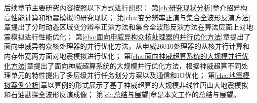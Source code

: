 后续章节主要研究内容按照以下方式进行组织：
第\ref{ch:研究现状分析}章介绍异构高性能计算和地震模拟的研究现状；
第\ref{cha:变分辨率正演与集合全波形反演方法}章提出了分时动态区域变分辨率正演方法和集合全波形反演方法在算法层面上对地震模拟进行性能优化；
第\ref{cha:面向申威异构众核处理器的并行优化方法}章提出了面向申威异构众核处理器的并行优化方法，从申威26010处理器的从核并行计算和内存带宽两方面对地震模拟进行优化；
第\ref{cha:面向神威超算系统的大规模并行优化方法}章提出了面向神威超算系统的大规模并行优化方法，根据神威超算不同处理单元的特性提出了多层级并行任务划分方案以及通信和IO优化；
第\ref{cha:地震模拟案例分析}章以算例的形式展示了基于神威超算的大规模非线性唐山大地震模拟和石油勘探全波形反演成像；
第\ref{ch:总结与展望}章是本文工作的总结与展望。



